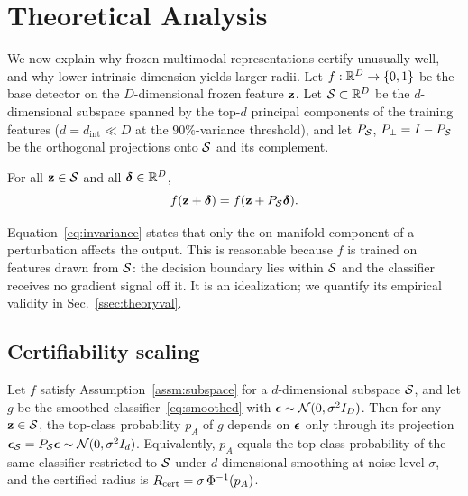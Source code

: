 \section{Theoretical Analysis}
\label{sec:theory}

We now explain why frozen multimodal representations certify unusually well, and why lower intrinsic dimension yields larger radii. Let $f:\mathbb{R}^D\to\{0,1\}$ be the base detector on the $D$-dimensional frozen feature ${\mathbf z}$. Let $\mathcal{S}\subset\mathbb{R}^D$ be the $d$-dimensional subspace spanned by the top-$d$ principal components of the training features ($d=d_{\mathrm{int}}\ll D$ at the $90\%$-variance threshold), and let $P_{\mathcal{S}}$, $P_\perp=I-P_{\mathcal{S}}$ be the orthogonal projections onto $\mathcal{S}$ and its complement.

\begin{assumption}
\label{assm:subspace}
For all ${\mathbf z}\in\mathcal{S}$ and all ${\boldsymbol \delta}\in\mathbb{R}^D$,
\begin{equation}
f({\mathbf z}+{\boldsymbol \delta})=f({\mathbf z}+P_{\mathcal{S}}{\boldsymbol \delta}).
\label{eq:invariance}
\end{equation}
\end{assumption}

Equation~\eqref{eq:invariance} states that only the on-manifold component of a perturbation affects the output. This is reasonable because $f$ is trained on features drawn from $\mathcal{S}$: the decision boundary lies within $\mathcal{S}$ and the classifier receives no gradient signal off it. It is an idealization; we quantify its empirical validity in Sec.~\ref{ssec:theoryval}.

\subsection{Certifiability scaling}

\begin{theorem}
\label{thm:scaling}
Let $f$ satisfy Assumption~\ref{assm:subspace} for a $d$-dimensional subspace $\mathcal{S}$, and let $g$ be the smoothed classifier~\eqref{eq:smoothed} with ${\boldsymbol \epsilon}\sim\mathcal{N}(0,\sigma^2 I_D)$. Then for any ${\mathbf z}\in\mathcal{S}$, the top-class probability $p_A$ of $g$ depends on ${\boldsymbol \epsilon}$ only through its projection ${\boldsymbol \epsilon}_{\mathcal{S}}=P_{\mathcal{S}}{\boldsymbol \epsilon}\sim\mathcal{N}(0,\sigma^2 I_d)$. Equivalently, $p_A$ equals the top-class probability of the same classifier restricted to $\mathcal{S}$ under $d$-dimensional smoothing at noise level $\sigma$, and the certified radius is $R_{\mathrm{cert}}=\sigma\,\Phi^{-1}(p_A)$.
\end{theorem}

